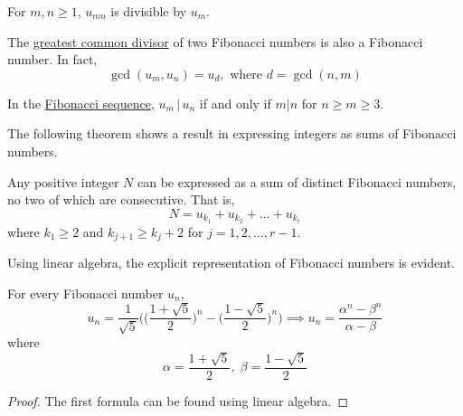 \documentclass{article}
\newcounter{theorem}[section]
\begin{document}
\begin{theorem}[Divisibility of $u_{mn}$ by $u_m$]
  \label{thm:divisibility-of-umn-by-um}
For $m, n \geq 1$, $u_{mn}$ is divisible by $u_m$. 
\end{theorem}

\begin{theorem}
  \label{thm:gcd-of-two-fibonacci-numbers}
The \hyperref[def:greatest-common-divisor]{greatest common divisor} of two Fibonacci numbers is also a Fibonacci number. In fact, 
\begin{equation}
  \gcd(u_m, u_n) = u_d, \text{ where } d = \gcd(n, m)
\end{equation}
\end{theorem}


\begin{corollary}
  \label{thm:divisibility-criterion-for-fibonacci-numbers}
In the \hyperref[def:fibonacci-sequence]{Fibonacci sequence}, $u_m \,|\, u_n$ if and only if $m|n$ for $n \geq m \geq 3$. 
\end{corollary}

The following theorem shows a result in expressing integers as sums of Fibonacci numbers. 

\begin{theorem}
  \label{thm:zeckendorf-representation}
Any positive integer $N$ can be expressed as a sum of distinct Fibonacci numbers, no two of which are consecutive. That is, 
\begin{equation}
  N = u_{k_1} + u_{k_2} + ... + u_{k_r}
\end{equation}
where $k_1 \geq 2$ and $k_{j+1} \geq k_j + 2$ for $j = 1, 2, ..., r-1$. 
\end{theorem}

Using linear algebra, the explicit representation of Fibonacci numbers is evident. 

\begin{theorem}
  \label{thm:binets-formula}
For every Fibonacci number $u_n$, 
\begin{equation}
  u_n = \frac{1}{\sqrt{5}} \Bigg( \bigg(\frac{1 + \sqrt{5}}{2} \bigg)^n - \bigg( \frac{1-\sqrt{5}}{2} \bigg)^n \Bigg) \implies u_n = \frac{\alpha^n - \beta^n}{\alpha - \beta}
\end{equation}
where
\begin{equation}
  \alpha = \frac{1 + \sqrt{5}}{2}, \; \beta = \frac{1-\sqrt{5}}{2}
\end{equation}
\end{theorem}
\begin{proof}
The first formula can be found using linear algebra. 
\end{proof}
\end{document}
